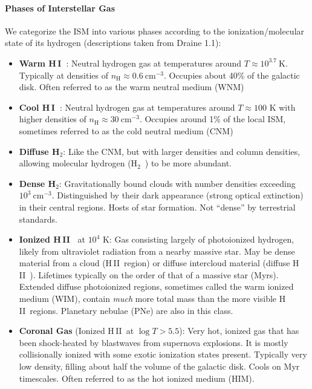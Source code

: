 \documentclass[10pt]{article}
\numberwithin{equation}{section}
\newcommand{\HI}{H\,I\ }
\newcommand{\HII}{H\,II\ }
\newcommand{\Htwo}{H$_2$\ }
\begin{document}
\paragraph{Phases of Interstellar Gas} %
\label{ssub:phases_of_interstellar_gas}
We categorize the ISM into various phases according to the ionization/molecular
state of its hydrogen (descriptions taken from Draine 1.1):
  \begin{itemize}
    \item \textbf{Warm \HI}: Neutral hydrogen gas at temperatures around $T \approx 10^{3.7}\ \mathrm{K}$. Typically at densities of $n_{\mathrm{H}}\approx 0.6\ \mathrm{cm^{-3}}$. Occupies about 40\% of the galactic disk. Often referred to as the warm neutral medium (WNM)
    \item \textbf{Cool \HI}: Neutral hydrogen gas at temperatures around $T \approx 100$ K with higher densities of $n_{\mathrm{H}}\approx 30\ \mathrm{cm^{-3}}$. Occupies around 1\% of the local ISM, sometimes referred to as the cold neutral medium (CNM)
    \item \textbf{Diffuse H}$_{2}$: Like the CNM, but with larger densities and column densities, allowing molecular hydrogen (\Htwo) to be more abundant.
    \item \textbf{Dense H}$_{2}$: Gravitationally bound clouds with number densities exceeding $10^3\ \mathrm{cm^{-3}}$. Distinguished by their dark appearance (strong optical extinction) in their central regions. Hosts of star formation. Not ``dense'' by terrestrial standards.
    \item \textbf{Ionized \HII} at $10^4$ K: Gas consisting largely of photoionized hydrogen, likely from ultraviolet radiation from a nearby massive star. May be dense material from a cloud (\HII region) or diffuse intercloud material (diffuse \HII). Lifetimes typically on the order of that of a massive star (Myrs). Extended diffuse photoionized regions, sometimes called the warm ionized medium (WIM), contain \emph{much} more total mass than the more visible \HII regions. Planetary nebulae (PNe) are also in this class.
    \item \textbf{Coronal Gas} (Ionized \HII at $\log T > 5.5$): Very hot, ionized gas that has been shock-heated by blastwaves from supernova explosions. It is mostly collisionally ionized with some exotic ionization states present. Typically very low density, filling about half the volume of the galactic disk. Cools on Myr timescales. Often referred to as the hot ionized medium (HIM).
  \end{itemize}
\end{document}
